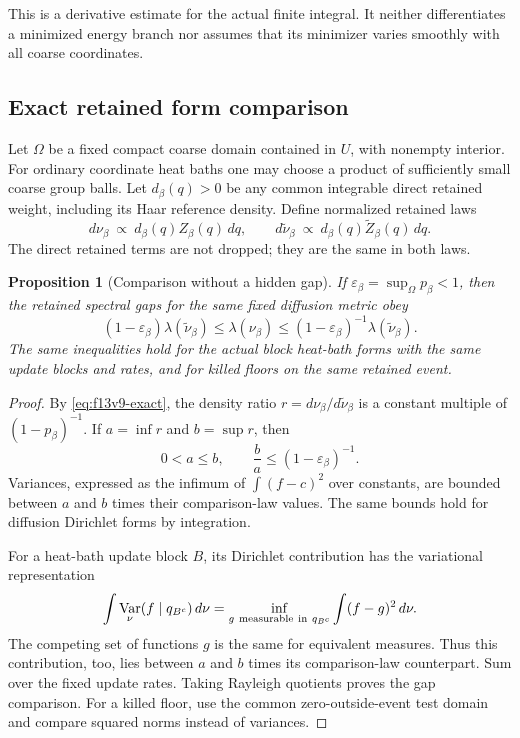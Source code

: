 \documentclass[11pt,oneside]{article}
\newtheorem{proposition}[theorem]{Proposition}
\DeclareMathOperator{\Var}{Var}
\begin{document}
This is a derivative estimate for
the actual finite integral. It
neither differentiates a minimized
energy branch nor assumes that
its minimizer varies smoothly with
all coarse coordinates.

\subsection{Exact retained form comparison}

Let \(\Omega\) be a fixed compact
coarse domain contained in \(U\),
with nonempty interior. For ordinary
coordinate heat baths one may choose
a product of sufficiently small
coarse group balls. Let \(d_\beta(q)>0\)
be any common integrable direct
retained weight, including its
Haar reference density. Define
normalized retained laws
\[
 d\nu_\beta\ \propto\
       d_\beta(q)Z_\beta(q)\,dq,\qquad
 d\widetilde\nu_\beta\ \propto\
       d_\beta(q)\widetilde Z_\beta(q)\,dq .
\]
The direct retained terms are not
dropped; they are the same in both
laws.

\begin{proposition}[Comparison without a hidden gap]
\label{prop:f13v9-forms}
If \(\varepsilon_\beta=\sup_\Omega p_\beta<1\),
then the retained spectral gaps for
the same fixed diffusion metric obey
\[
 (1-\varepsilon_\beta)
          \lambda(\widetilde\nu_\beta)
 \le\lambda(\nu_\beta)
 \le(1-\varepsilon_\beta)^{-1}
          \lambda(\widetilde\nu_\beta).
\]
The same inequalities hold for the
actual block heat-bath forms with
the same update blocks and rates,
and for killed floors on the same
retained event.
\end{proposition}

\begin{proof}
By \eqref{eq:f13v9-exact}, the density
ratio \(r=d\nu_\beta/d\widetilde\nu_\beta\)
is a constant multiple of
\((1-p_\beta)^{-1}\). If
\(a=\inf r\) and \(b=\sup r\), then
\[
 0<a\le b,\qquad
 \frac ba\le(1-\varepsilon_\beta)^{-1}.
\]
Variances, expressed as the infimum
of \(\int(f-c)^2\) over constants,
are bounded between \(a\) and \(b\)
times their comparison-law values.
The same bounds hold for diffusion
Dirichlet forms by integration.

For a heat-bath update block \(B\),
its Dirichlet contribution has the
variational representation
\[
 \int\Var_\nu(f\mid q_{B^c})\,d\nu
 =\inf_{g\ {\rm measurable\ in}\ q_{B^c}}
                     \int(f-g)^2\,d\nu .
\]
The competing set of functions \(g\)
is the same for equivalent measures.
Thus this contribution, too, lies
between \(a\) and \(b\) times its
comparison-law counterpart. Sum over
the fixed update rates. Taking
Rayleigh quotients proves the gap
comparison. For a killed floor,
use the common zero-outside-event
test domain and compare squared
norms instead of variances.
\end{proof}
\end{document}
